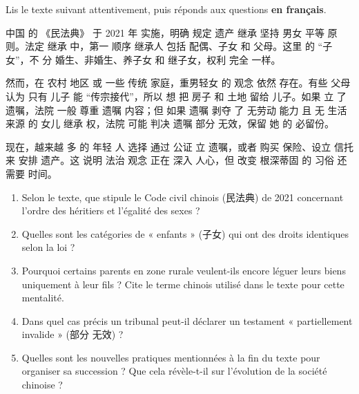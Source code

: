 \documentclass[11pt]{article}
\begin{document}
\begin{exercice}
Lis le texte suivant attentivement, puis réponds aux questions \textbf{en français}.

\begin{textebox}
中国 的 《民法典》 于 2021 年 实施，明确 规定 遗产 继承 坚持 男女 平等 原则。法定 继承 中，第一 顺序 继承人 包括 配偶、子女 和 父母。这里 的 “子女”，不 分 婚生、非婚生、养子女 和 继子女，权利 完全 一样。

然而，在 农村 地区 或 一些 传统 家庭，重男轻女 的 观念 依然 存在。有些 父母 认为 只有 儿子 能 “传宗接代”，所以 想 把 房子 和 土地 留给 儿子。如果 立 了 遗嘱，法院 一般 尊重 遗嘱 内容；但 如果 遗嘱 剥夺 了 无劳动 能力 且 无 生活 来源 的 女儿 继承 权，法院 可能 判决 遗嘱 部分 无效，保留 她 的 必留份。

现在，越来越 多 的 年轻 人 选择 通过 公证 立 遗嘱，或者 购买 保险、设立 信托 来 安排 遗产。这 说明 法治 观念 正在 深入 人心，但 改变 根深蒂固 的 习俗 还 需要 时间。
\end{textebox}

\begin{enumerate}
    \item Selon le texte, que stipule le Code civil chinois (民法典) de 2021 concernant l'ordre des héritiers et l'égalité des sexes ?
    \item Quelles sont les catégories de « enfants » (子女) qui ont des droits identiques selon la loi ?
    \item Pourquoi certains parents en zone rurale veulent-ils encore léguer leurs biens uniquement à leur fils ? Cite le terme chinois utilisé dans le texte pour cette mentalité.
    \item Dans quel cas précis un tribunal peut-il déclarer un testament « partiellement invalide » (部分 无效) ?
    \item Quelles sont les nouvelles pratiques mentionnées à la fin du texte pour organiser sa succession ? Que cela révèle-t-il sur l'évolution de la société chinoise ?
\end{enumerate}
\end{exercice}
\end{document}
